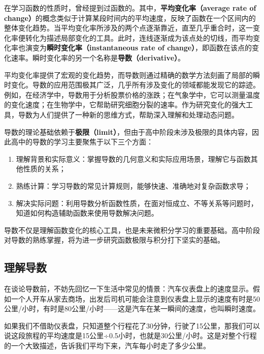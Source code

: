 
\begin{issues}
\issueDraft
\end{issues}

在学习函数的性质时，曾经提到过函数的。其中，\textbf{平均变化率（average rate of change）}的概念类似于计算某段时间内的平均速度，反映了函数在一个区间内的整体变化趋势。当平均变化率所涉及的两个点逐渐靠近，直至几乎重合时，这一变化率便转化为描述局部变化的工具。此时，连线逐渐成为该点处的切线，而平均变化率也演变为\textbf{瞬时变化率（instantaneous rate of change）}，即函数在该点的变化速率。瞬时变化率的另一个名称是\textbf{导数（derivative）}。

平均变化率提供了宏观的变化趋势，而导数则通过精确的数学方法刻画了局部的瞬时变化。导数的应用范围极其广泛，几乎所有涉及变化的领域都能发现它的踪迹。例如，在经济学中，导数用于分析股票价格的涨跌；在气象学中，它可以测量温度的变化速度；在生物学中，它帮助研究细胞分裂的速率。作为研究变化的强大工具，导数为人们提供了一种新的思维方式，帮助深入理解和处理动态问题。

导数的理论基础依赖于\textbf{极限（limit）}，但由于高中阶段未涉及极限的具体内容，因此高中的导数的学习主要聚焦于以下三个方面：
\begin{enumerate}
\item 理解背景和实际意义：掌握导数的几何意义和实际应用场景，理解它与函数其他性质的关系；
\item 熟练计算：学习导数的常见计算规则，能够快速、准确地对复杂函数求导；
\item 解决实际问题：利用导数分析函数性质，在面对恒成立、不等关系等问题时，知道如何构造辅助函数来使用导数解决问题。
\end{enumerate}

导数不仅是理解函数变化的核心工具，也是未来微积分学习的重要基础。高中阶段对导数的熟练掌握，将为进一步研究函数极限与积分打下坚实的基础。

\subsection{理解导数}

在谈论导数前，不妨先回忆一下生活中常见的情景：汽车仪表盘上的速度显示。假如一个人开车从家去商场，出发后司机可能会注意到仪表盘上显示的速度有时是50公里/小时，有时是80公里/小时——这是汽车在某一瞬间的速度，也叫瞬时速度。

如果我们不借助仪表盘，只知道整个行程花了30分钟，行驶了15公里，那我们可以说这段旅程的平均速度是15公里÷0.5小时，也就是30公里/小时。这是对整个行程的一个大致描述，告诉我们平均下来，汽车每小时走了多少公里。

